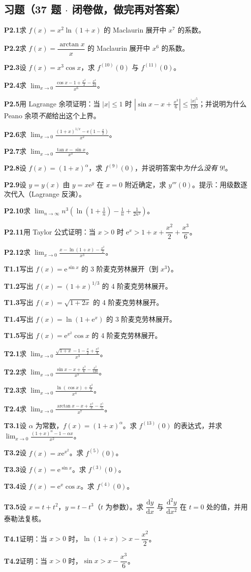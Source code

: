 \documentclass[11pt,a4paper]{ctexart}
\newcommand{\abs}[1]{\left\lvert #1\right\rvert}
\newcommand{\ee}{\mathrm{e}}
\newcommand{\D}{\mathrm{d}}
\newcommand{\q}[2]{\par\medskip\noindent\textbf{#1}\quad #2\par}
\begin{document}
\subsection{习题（37 题 $\cdot$ 闭卷做，做完再对答案）}
\q{P2.1}{求 $f(x)=x^{2}\ln(1+x)$ 的 Maclaurin 展开中 $x^{7}$ 的系数。}
\q{P2.2}{求 $f(x)=\dfrac{\arctan x}{x}$ 的 Maclaurin 展开中 $x^{6}$ 的系数。}
\q{P2.3}{设 $f(x)=x^{3}\cos x$，求 $f^{(10)}(0)$ 与 $f^{(11)}(0)$。}
\q{P2.4}{求 $\displaystyle\lim_{x\to 0}\frac{\cos x-1+\frac{x^{2}}{2}-\frac{x^{4}}{24}}{x^{6}}$。}
\q{P2.5}{用 Lagrange 余项证明：当 $\abs{x}\le 1$ 时 $\abs{\sin x-x+\frac{x^{3}}{6}}\le \frac{\abs{x}^{5}}{120}$；并说明为什么 Peano 余项\emph{不能}给出这个上界。}
\q{P2.6}{求 $\displaystyle\lim_{x\to 0}\frac{(1+x)^{1/x}-\ee\left(1-\frac{x}{2}\right)}{x^{2}}$。}
\q{P2.7}{求 $\displaystyle\lim_{x\to 0}\frac{\tan x-\sin x}{x^{3}}$。}
\q{P2.8}{设 $f(x)=(1+x)^{\alpha}$，求 $f^{(9)}(0)$，并说明答案中\emph{为什么没有} $9!$。}
\q{P2.9}{设 $y=y(x)$ 由 $y=x\ee^{y}$ 在 $x=0$ 附近确定，求 $y'''(0)$。提示：用级数逐次代入（Lagrange 反演）。}
\q{P2.10}{求 $\displaystyle\lim_{n\to\infty}n^{3}\left(\ln\left(1+\frac{1}{n}\right)-\frac{1}{n}+\frac{1}{2n^{2}}\right)$。}
\q{P2.11}{用 Taylor 公式证明：当 $x>0$ 时 $\ee^{x}>1+x+\dfrac{x^{2}}{2}+\dfrac{x^{3}}{6}$。}
\q{P2.12}{求 $\displaystyle\lim_{x\to 0}\frac{x-\ln(1+x)-\frac{x^{2}}{2}}{x^{3}}$。}
\q{T1.1}{写出 $f(x)=\ee^{\sin x}$ 的 3 阶麦克劳林展开（到 $x^{3}$）。}
\q{T1.2}{写出 $f(x)=(1+x)^{1/3}$ 的 4 阶麦克劳林展开。}
\q{T1.3}{写出 $f(x)=\sqrt{1+2x}$ 的 4 阶麦克劳林展开。}
\q{T1.4}{写出 $f(x)=\ln(1+\ee^{x})$ 的 3 阶麦克劳林展开。}
\q{T1.5}{写出 $f(x)=\ee^{x^{2}}\cos x$ 的 4 阶麦克劳林展开。}
\q{T2.1}{求 $\displaystyle\lim_{x\to0}\frac{\sqrt{1+x}-1-\frac{x}{2}+\frac{x^{2}}{8}}{x^{3}}$。}
\q{T2.2}{求 $\displaystyle\lim_{x\to0}\frac{\sin x-x+\frac{x^{3}}{6}-\frac{x^{5}}{120}}{x^{7}}$。}
\q{T2.3}{求 $\displaystyle\lim_{x\to0}\frac{\ln(\cos x)+\frac{x^{2}}{2}}{x^{4}}$。}
\q{T2.4}{求 $\displaystyle\lim_{x\to0}\frac{\arctan x-x+\frac{x^{3}}{3}-\frac{x^{5}}{5}}{x^{7}}$。}
\q{T3.1}{设 $\alpha$ 为常数，$f(x)=(1+x)^{\alpha}$。求 $f^{(13)}(0)$ 的表达式，并求 $\displaystyle\lim_{x\to0}\frac{(1+x)^{\alpha}-1-\alpha x}{x^{2}}$。}
\q{T3.2}{设 $f(x)=x\ee^{x^{2}}$。求 $f^{(5)}(0)$。}
\q{T3.3}{设 $f(x)=\ee^{\sin x}$。求 $f^{(3)}(0)$。}
\q{T3.4}{设 $f(x)=\ee^{x}\cos x$。求 $f^{(4)}(0)$。}
\q{T3.5}{设 $x=t+t^{2}$，$y=t-t^{3}$（$t$ 为参数）。求 $\dfrac{\D y}{\D x}$ 与 $\dfrac{\D^{2}y}{\D x^{2}}$ 在 $t=0$ 处的值，并用泰勒法复核。}
\q{T4.1}{证明：当 $x>0$ 时，$\ln(1+x)>x-\dfrac{x^{2}}{2}$。}
\q{T4.2}{证明：当 $x>0$ 时，$\sin x>x-\dfrac{x^{3}}{6}$。}
\end{document}
